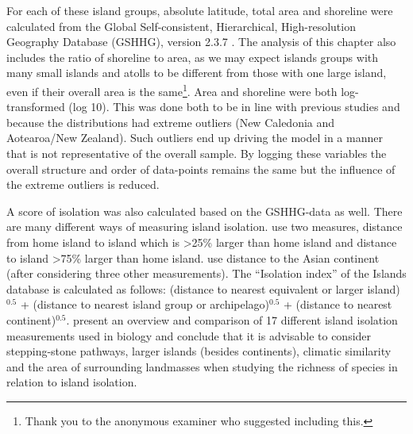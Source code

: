 \documentclass[a4paper,10pt]{article} %
\begin{document}
For each of these island groups, absolute latitude, total area and shoreline were calculated from the Global Self-consistent, Hierarchical, High-resolution Geography Database (GSHHG), version 2.3.7 \citep{wessel1996global}. The analysis of this chapter also includes the ratio of shoreline to area, as we may expect islands groups with many small islands and atolls to be different from those with one large island, even if their overall area is the same\footnote{Thank you to the anonymous examiner who suggested including this.}. Area and shoreline were both log-transformed (log 10). This was done both to be in line with previous studies \citep{gavin2012island} and because the distributions had extreme outliers (New Caledonia and Aotearoa/New Zealand). Such outliers end up driving the model in a manner that is not representative of the overall sample. By logging these variables the overall structure and order of data-points remains the same but the influence of the extreme outliers is reduced.


A score of isolation was also calculated based on the GSHHG-data as well. There are many different ways of measuring island isolation. \citet{rolett2004environmental} use two measures, distance from home island to island which is >25\% larger than home island and distance to island >75\% larger than home island. \citet{gavin2012island} use distance to the Asian continent (after considering three other measurements). The ``Isolation index'' of the Islands database \citep{dahl1991island}  is calculated as follows: (distance to nearest equivalent or larger island)$^{0.5}$ + (distance to nearest island group or archipelago)$^{0.5}$ + (distance to nearest continent)$^{0.5}$. \citet{weigelt_2013} present an overview and comparison of 17 different island isolation measurements used in biology and conclude that it is advisable to consider stepping-stone pathways, larger islands (besides continents), climatic similarity and the area of surrounding landmasses when studying the richness of species in relation to island isolation.
\end{document}
